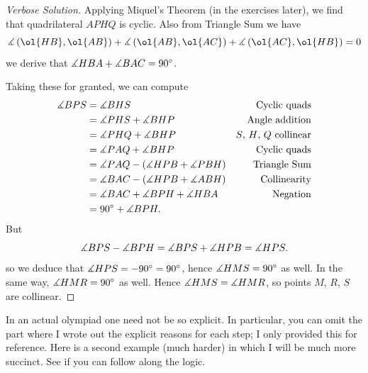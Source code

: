 \documentclass[11pt]{scrartcl}
\begin{document}
\begin{proof}
  [Verbose Solution]
  Applying Miquel's Theorem (in the exercises later),
  we find that quadrilateral $APHQ$ is cyclic.
  Also from Triangle Sum we have
  \[ \dang \left( \ol{HB}, \ol{AB} \right)
    + \dang \left( \ol{AB}, \ol{AC} \right)
    + \dang \left( \ol{AC}, \ol{HB} \right)
    = 0 \]
   we derive that $\measuredangle HBA + \measuredangle BAC = 90^\circ$.

  Taking these for granted,
  we can compute
  \begin{align*}
    \measuredangle BPS &= \measuredangle BHS & \text{Cyclic quads} \\
    &= \measuredangle PHS + \measuredangle BHP & \text{Angle addition} \\
    &= \measuredangle PHQ + \measuredangle BHP & \text{$S$, $H$, $Q$ collinear} \\
    &= \measuredangle PAQ + \measuredangle BHP & \text{Cyclic quads} \\
    &= \measuredangle PAQ - (\measuredangle HPB + \measuredangle PBH) & \text{Triangle Sum} \\
    &= \measuredangle BAC - (\measuredangle HPB + \measuredangle ABH) & \text{Collinearity} \\
    &= \measuredangle BAC + \measuredangle BPH + \measuredangle HBA & \text{Negation} \\
    &= 90^\circ + \measuredangle BPH. &
  \end{align*}
  But \[ \measuredangle BPS - \measuredangle BPH
    = \measuredangle BPS + \measuredangle HPB = \measuredangle HPS. \]
  so we deduce that $\measuredangle HPS = -90^\circ = 90^\circ$,
  hence $\measuredangle HMS = 90^\circ$ as well.
  In the same way, $\measuredangle HMR = 90^\circ$ as well.
  Hence $\measuredangle HMS = \measuredangle HMR$, so points $M$, $R$, $S$ are collinear.
\end{proof}
In an actual olympiad one need not be so explicit.
In particular, you can omit the part where I wrote out the explicit reasons
for each step; I only provided this for reference.
Here is a second example (much harder) in which I will be much more succinct.
See if you can follow along the logic.
\end{document}
